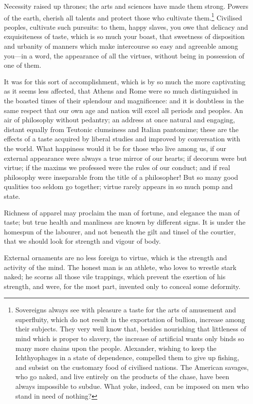 Necessity raised up thrones; the arts and sciences have made them
strong. Powers of the earth, cherish all talents and protect those who
cultivate them.\footnote{Sovereigns always see with pleasure a taste
for the arts of amusement and superfluity, which do not result in the
exportation of bullion, increase among their subjects. They very well
know that, besides nourishing that littleness of mind which is proper
to slavery, the increase of artificial wants only binds so many more
chains upon the people. Alexander, wishing to keep the Ichthyophages
in a state of dependence, compelled them to give up fishing, and
subsist on the customary food of civilised nations. The American
savages, who go naked, and live entirely on the products of the chase,
have been always impossible to subdue. What yoke, indeed, can be
imposed on men who stand in need of nothing?} Civilised peoples,
cultivate such pursuits: to them, happy slaves, you owe that delicacy
and exquisiteness of taste, which is so much your boast, that
sweetness of disposition and urbanity of manners which make
intercourse so easy and agreeable among you---in a word, the
appearance of all the virtues, without being in possession of one of
them.

It was for this sort of accomplishment, which is by so much the more
captivating as it seems less affected, that Athens and Rome were so
much distinguished in the boasted times of their splendour and
magnificence: and it is doubtless in the same respect that our own age
and nation will excel all periods and peoples. An air of philosophy
without pedantry; an address at once natural and engaging, distant
equally from Teutonic clumsiness and Italian pantomime; these are the
effects of a taste acquired by liberal studies and improved by
conversation with the world. What happiness would it be for those who
live among us, if our external appearance were always a true mirror of
our hearts; if decorum were but virtue; if the maxims we professed
were the rules of our conduct; and if real philosophy were inseparable
from the title of a philosopher! But so many good qualities too seldom
go together; virtue rarely appears in so much pomp and state.

Richness of apparel may proclaim the man of fortune,  and
elegance the man of taste; but true health and manliness are known by
different signs. It is under the homespun of the labourer, and not
beneath the gilt and tinsel of the courtier, that we should look for
strength and vigour of body.

External ornaments are no less foreign to virtue, which is the
strength and activity of the mind. The honest man is an athlete, who
loves to wrestle stark naked; he scorns all those vile trappings,
which prevent the exertion of his strength, and were, for the most
part, invented only to conceal some deformity.

